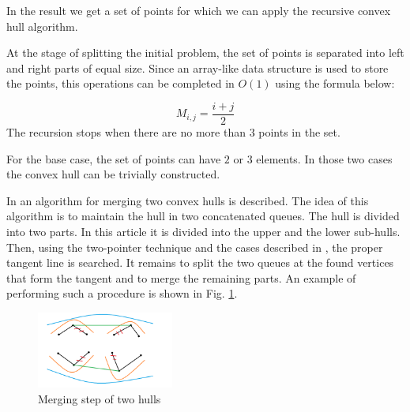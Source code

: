 \documentclass[twoside,twocolumn,10pt]{article}
\begin{document}
	In the result we get a set of points for which we can apply the recursive convex hull algorithm.


	At the stage of splitting the initial problem, the set of points is separated into left and right parts of equal size. Since an array-like data structure is used to store the points, this operations can be completed in $O(1)$ using the formula below:
	
	\begin{equation}
	M_{i,j}=\frac{i+j}{2}
	\end{equation}
	The recursion stops when there are no more than $3$ points in the set.
	
	For the base case, the set of points can have $2$ or $3$ elements. In those two cases the convex hull can be trivially constructed. 
	
	

	In \cite{overmars} an algorithm for merging two convex hulls is described. The idea of this algorithm is to maintain the hull in two concatenated queues. The hull is divided into two parts. In this article it is divided into the upper and the lower sub-hulls. Then, using the two-pointer technique and the cases described in \cite{overmars}, the proper tangent line is searched. 
	It remains to split the two queues at the found vertices that form the tangent and to merge the remaining parts. An example of performing such a procedure is shown in Fig. \ref{fig:ch_union}.
	
	\begin{figure}[t]
		\centering
		\includegraphics[width=0.4\textwidth, height=0.2\textheight]{ch_union}
		\caption{Merging step of two hulls}
		\label{fig:ch_union}
	\end{figure}
	
\end{document}
